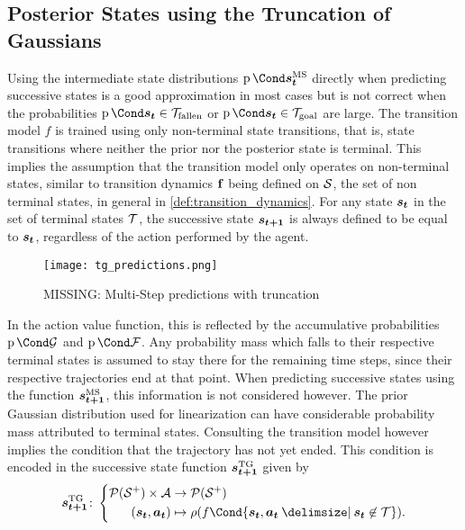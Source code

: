 \subsection{Posterior States using the Truncation of Gaussians}
Using the intermediate state distributions $\Prob{\ms{\rv{s_t}}}$ directly when predicting successive states is a good approximation in most cases but is not correct when the probabilities $\Prob{\rv{s_t} \in \Fallen}$ or $\Prob{\rv{s_t} \in \Goal}$ are large.
The transition model $f$ is trained using only non-terminal state transitions, that is, state transitions where neither the prior nor the posterior state is terminal.
This implies the assumption that the transition model only operates on non-terminal states, similar to transition dynamics $\operatorname{\mathbf{f}}$ being defined on $\mathcal{S}$, the set of non terminal states, in general in \cref{def:transition_dynamics}.
For any state $\bm{s_t}$ in the set of terminal states $\mathcal{T}$, the successive state $\bm{s_{t+1}}$ is always defined to be equal to $\bm{s_t}$, regardless of the action performed by the agent.

\begin{figure}[t]
    \centering
    \texttt{[image: tg\_predictions.png]}
    \caption{MISSING: Multi-Step predictions with truncation}
    \label{fig:ms_truncation_predictions}
\end{figure}
In the action value function, this is reflected by the accumulative probabilities $\Prob{\PGoal}$ and $\Prob{\PFallen}$.
Any probability mass which falls to their respective terminal states is assumed to stay there for the remaining time steps, since their respective trajectories end at that point.
When predicting successive states using the function $\bm{s_{t+1}}^{\text{MS}}$, this information is not considered however.
The prior Gaussian distribution used for linearization can have considerable probability mass attributed to terminal states.
Consulting the transition model however implies the condition that the trajectory has not yet ended.
This condition is encoded in the successive state function $\bm{s_{t+1}}^{\text{TG}}$ given by
\begin{align}
    \tg{\mat{s_{t+1}}} \colon \left\{
        \begin{aligned}
            \Dists(\Es^+) \times \Ah &\to \Dists(\Es^+) \\
            (\rv{s_t}, \mat{a_t}) &\mapsto \squeeze(f\Cond{\rv{s_t}, \mat{a_t} \given \rv{s_t} \not\in \Tee}).
    \end{aligned}
    \right.
\end{align}

